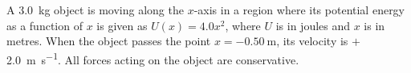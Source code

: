\documentclass{../../../oss-apphys-exam}
\begin{document}
\begin{questions}
%    
%    
  
  \question A \SI{3.0}{\kilo\gram} object is moving along the $x$-axis in a
  region where its potential energy as a function of $x$ is given as
  $U(x)=4.0x^2$, where $U$ is in joules and $x$ is in metres. When the object
  passes the point $x=\SI{-0.50}\metre$, its velocity is
  $+$\SI{2.0}{\metre\per\second}. All forces acting on the object are
  conservative.
\end{questions}
\end{document}
